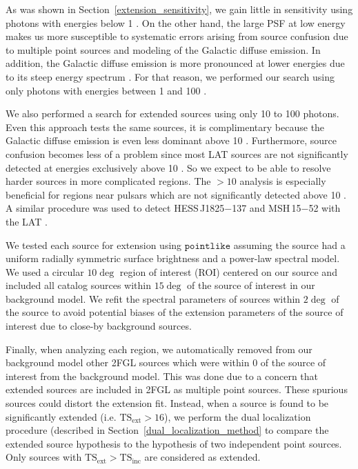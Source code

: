 \documentclass[12pt,preprint]{aastex}
\newcommand{\gev}{\text{GeV}\xspace}
\newcommand{\tsext}{{\ensuremath{\text{TS}_{\text{ext}}}}\xspace}
\newcommand{\tsinc}{\ensuremath{\text{TS}_{\text{inc}}}\xspace}
\newcommand{\pointlike}{\ensuremath{\mathtt{pointlike}}\xspace}
\begin{document}
As was shown in Section~\ref{extension_sensitivity}, we gain little in sensitivity using photons with energies
below 1 \gev. On the other hand, the large PSF at low energy makes us
more susceptible to systematic errors arising from source confusion due
to multiple point sources and modeling of the
Galactic diffuse emission. In addition, the Galactic diffuse emission
is more pronounced at lower energies due to its steep energy spectrum
\citep{intermediate_diffuse_lat}.
For that reason, we performed our search using only photons with
energies between 1 \gev and 100 \gev. 

We also performed a search for extended sources using only 10 \gev to 100 \gev photons. 
Even this approach tests the same
sources, it is complimentary because the Galactic diffuse
emission is even less dominant above 10 \gev. Furthermore, source
confusion becomes less of a problem since most LAT sources are not
significantly detected at energies exclusively above 10 \gev. So we
expect to be able to resolve harder sources in more complicated regions. The $>10$ \gev
analysis is
especially
beneficial for regions near pulsars which are not significantly detected 
above 10 \gev. A similar procedure was
used to detect HESS\,J1825$-$137 and MSH\,15$-$52 with the LAT
\citep{msh1552,fermi_hess_j1825}.

We tested each source for extension using
\pointlike
assuming the source had a uniform radially symmetric surface brightness
and a power-law spectral model.
We used a circular $10\deg$ region of interest (ROI) centered on our source and
included all catalog sources within $15\deg$ of the source of interest
in our background model.
We refit the spectral parameters of sources within $2\deg$ of the source
to avoid potential biases of the extension parameters of the source of
interest due to close-by background sources.

Finally, when analyzing each region, we automatically removed from
our background model other 2FGL sources which were within 0 of
the source of interest from the background model. This was done due
to a concern that extended sources are included in 2FGL as multiple
point sources. These spurious sources could distort the extension
fit.  Instead, when a source is found to be significantly extended
(i.e. $\tsext>16$), we perform the dual localization procedure (described
in Section~\ref{dual_localization_method} to compare the extended source
hypothesis to the hypothesis of two independent point sources. Only
sources with $\tsext>\tsinc$ are considered as extended.
\end{document}
